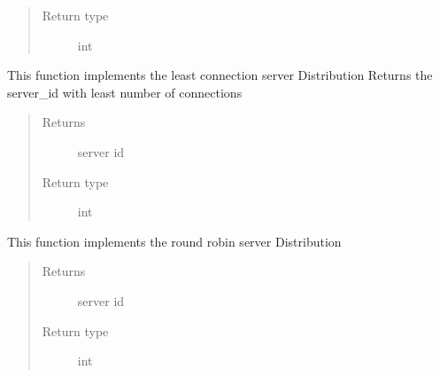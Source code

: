 \documentclass[letterpaper,10pt,english]{sphinxmanual}
\begin{document}
\begin{fulllineitems}
\begin{fulllineitems}
\begin{quote}
\begin{description}
\item[{Return type}] \leavevmode
int

\end{description}\end{quote}

\end{fulllineitems}


\begin{fulllineitems}
\label{\detokenize{lb_msg:lb_msg.LoadBalancerMessage._getLeastConnServer}}
This function implements the least connection server Distribution
Returns the server\_id with least number of connections
\begin{quote}\begin{description}
\item[{Returns}] \leavevmode
server id

\item[{Return type}] \leavevmode
int

\end{description}\end{quote}

\end{fulllineitems}


\begin{fulllineitems}
\label{\detokenize{lb_msg:lb_msg.LoadBalancerMessage._getRoundRobinServer}}
This function implements the round robin server Distribution
\begin{quote}\begin{description}
\item[{Returns}] \leavevmode
server id

\item[{Return type}] \leavevmode
int

\end{description}\end{quote}

\end{fulllineitems}



\end{fulllineitems}
\end{document}
